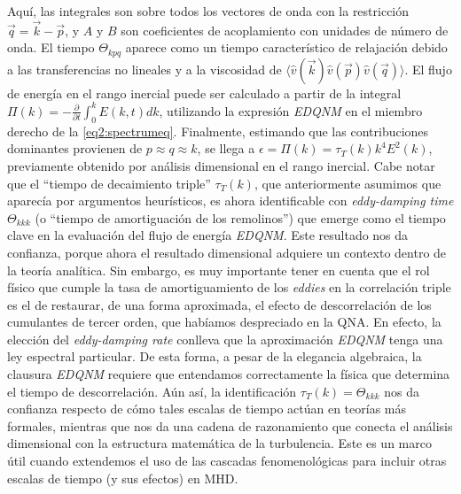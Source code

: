 Aquí, las integrales son sobre todos los vectores de onda con la
restricción $\vec{q} = \vec{k} - \vec{p}$, y $A$ y $B$ son
coeficientes de acoplamiento con unidades de número de onda.  El
tiempo $\Theta_{kpq}$ aparece como un tiempo característico de
relajación debido a las transferencias no lineales y a la viscosidad
de $\langle \hat{v}(\vec{k}) \hat{v}(\vec{p}) \hat{v}(\vec{q})
\rangle$.  El flujo de energía en el rango inercial puede ser
calculado a partir de la integral $\Pi(k) = -\frac{\partial}{\partial
  t} \int_0^k E(k, t) dk$, utilizando la expresión \textit{EDQNM} en
el miembro derecho de la \cref{eq2:spectrumeq}. Finalmente, estimando
que las contribuciones dominantes provienen de $p \approx q \approx
k$, se llega a $\epsilon = \Pi(k) = \tau_T(k) k^4 E^2(k)$, previamente
obtenido por análisis dimensional en el rango inercial. Cabe notar que
el ``tiempo de decaimiento triple'' $\tau_T(k)$, que anteriormente
asumimos que aparecía por argumentos heurísticos, es ahora
identificable con \textit{eddy-damping time} $\Theta_{kkk}$ (o
``tiempo de amortiguación de los remolinos'') que emerge como el
tiempo clave en la evaluación del flujo de energía
\textit{EDQNM}. Este resultado nos da confianza, porque ahora el
resultado dimensional adquiere un contexto dentro de la teoría
analítica. Sin embargo, es muy importante tener en cuenta que el rol
físico que cumple la tasa de amortiguamiento de los \textit{eddies} en
la correlación triple es el de restaurar, de una forma aproximada, el
efecto de descorrelación de los cumulantes de tercer orden, que
habíamos despreciado en la QNA. En efecto, la elección del
\textit{eddy-damping rate} conlleva que la aproximación \textit{EDQNM}
tenga una ley espectral particular. De esta forma, a pesar de la
elegancia algebraica, la clausura \textit{EDQNM} requiere que
entendamos correctamente la física que determina el tiempo de
descorrelación. Aún así, la identificación $\tau_T(k) = \Theta_{kkk}$
nos da confianza respecto de cómo tales escalas de tiempo actúan en
teorías más formales, mientras que nos da una cadena de razonamiento
que conecta el análisis dimensional con la estructura matemática de la
turbulencia. Este es un marco útil cuando extendemos el uso de las
cascadas fenomenológicas para incluir otras escalas de tiempo (y sus
efectos) en MHD.

